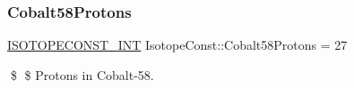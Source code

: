 \subsubsection{\texorpdfstring{Cobalt58\+Protons}{Cobalt58Protons}}
{\footnotesize\ttfamily \mbox{\hyperlink{group___isotope_const-_macros_ga5f18360b3e99483a35c32d789e62621c}{I\+S\+O\+T\+O\+P\+E\+C\+O\+N\+S\+T\+\_\+\+I\+NT}} Isotope\+Const\+::\+Cobalt58\+Protons = 27}

\$ \$ Protons in Cobalt-\/58. 